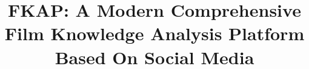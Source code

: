 \documentclass[sigconf]{acmart}
\begin{document}
\title[FKAP: A Modern Comprehensive Film Knowledge Analysis Platform ]{FKAP: A Modern Comprehensive Film Knowledge Analysis Platform Based On Social Media}

\maketitle















\end{document}
